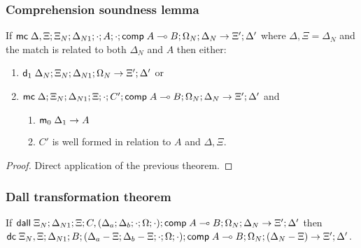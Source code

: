 \subsubsection{Comprehension soundness lemma}

If $\mathsf{mc} \; \Delta, \Xi; \Xi_N; \Delta_{N1}; \cdot; A; \cdot; \mathsf{comp} \; A \multimap B; \Omega_N; \Delta_N \rightarrow \Xi'; \Delta'$ where $\Delta, \Xi = \Delta_N$ and the match is related to both $\Delta_N$ and $A$ then either:\\
\begin{enumerate}
   \item $\mathsf{d}_1 \; \Delta_N; \Xi_N; \Delta_{N1}; \Omega_N \rightarrow \Xi'; \Delta'$ or
   \item $\mathsf{mc} \; \Delta; \Xi_N; \Delta_{N1}; \Xi; \cdot; C'; \mathsf{comp} \; A \multimap B; \Omega_N; \Delta_N \rightarrow \Xi'; \Delta'$ and
      \begin{enumerate}
         \item $\mathsf{m}_0 \; \Delta_1 \rightarrow A$
         \item $C'$ is well formed in relation to $A$ and $\Delta, \Xi$.
      \end{enumerate}
\end{enumerate}

\begin{proof}
Direct application of the previous theorem.
\end{proof}

\subsubsection{Dall transformation theorem}

If $\mathsf{dall} \; \Xi_N; \Delta_{N1}; \Xi; C, (\Delta_a; \Delta_b; \cdot; \Omega; \cdot); \mathsf{comp} \; A \multimap B; \Omega_N; \Delta_N \rightarrow \Xi'; \Delta'$ then 
$\mathsf{dc} \; \Xi_N, \Xi; \Delta_{N1}; B; (\Delta_a - \Xi; \Delta_b - \Xi; \cdot; \Omega; \cdot); \mathsf{comp} \; A \multimap B; \Omega_N; (\Delta_N - \Xi) \rightarrow \Xi'; \Delta'$.

